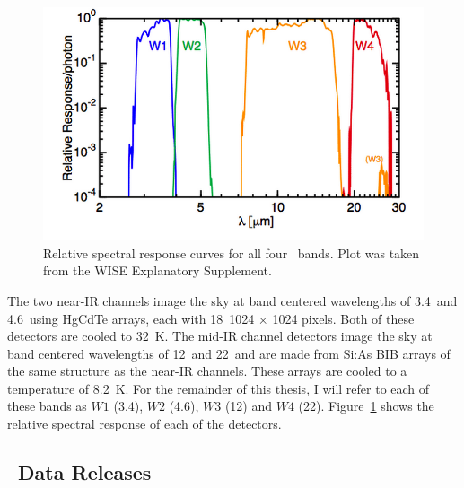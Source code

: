     \begin{figure}
    \centering
    \includegraphics[scale=0.5]{Ch2/wise_response}
    \caption[\WS\ Bands]{Relative spectral response curves for all four \WS\ bands. Plot was taken from the WISE Explanatory Supplement.}
    \label{fig:wise_bands}
    \end{figure}
   
   
   The two near-IR channels image the sky at band centered wavelengths of 3.4\micron\ and 4.6\micron\ using HgCdTe arrays, each with 18\micron\ 1024 $\times$ 1024 pixels. Both of these detectors are cooled to 32~K. The mid-IR channel detectors image the sky at band centered wavelengths of 12\micron\ and 22\micron\ and are made from Si:As BIB arrays of the same structure as the near-IR channels. These arrays are cooled to a temperature of 8.2~K. For the remainder of this thesis, I will refer to each of these bands as $W1$ (3.4\micron), $W2$ (4.6\micron), $W3$ (12\micron) and $W4$ (22\micron). Figure~\ref{fig:wise_bands} shows the relative spectral response of each of the detectors. 
   
    
    
   
    \subsection{\WS\ Data Releases}

